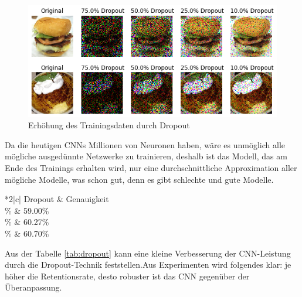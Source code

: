 \documentclass[12pt,a4paper]{scrartcl}
\numberwithin{equation}{section}
\begin{document}
	\begin{figure}[h!]
		\centering
		\includegraphics[width=\textwidth]{model}
		\caption{Erhöhung des Trainingsdaten durch Dropout}
		\label{fig:DropoutDataAugmentation}
	\end{figure}
	
Da die heutigen \acsp{CNN} Millionen von Neuronen haben, wäre es unmöglich alle mögliche ausgedünnte Netzwerke zu trainieren, deshalb ist das Modell, das am Ende des Trainings erhalten wird, nur eine durchschnittliche Approximation aller mögliche Modelle, was schon gut, denn es gibt schlechte und gute Modelle.
	\begin{table}[h!]
		\centering
		\begin{tabular}{*2{|c}|}
			\hline
			Dropout & Genauigkeit \\ \% & 59.00\% \\ \% & 60.27\% \\ \% & 60.70\% \\ \hline
		\end{tabular}
	\caption{Anwendung von Dropout Technik.}
	\label{tab:dropout}
	\end{table}

Aus der Tabelle \ref{tab:dropout} kann eine kleine Verbesserung der CNN-Leistung durch die Dropout-Technik feststellen.Aus Experimenten wird folgendes klar: je höher die Retentionsrate, desto robuster ist das CNN gegenüber der Überanpassung.
\end{document}
